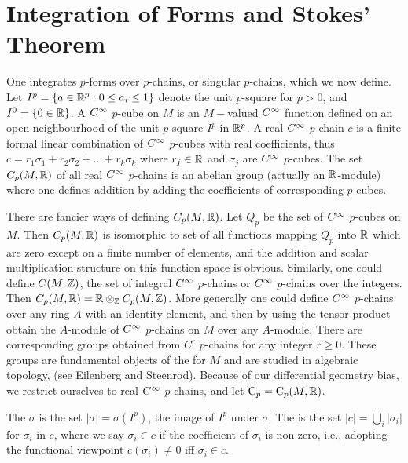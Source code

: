 \documentclass[../main]{subfiles}
\begin{document}
\section{Integration of Forms and Stokes' Theorem}\label{ch07:s5}
One integrates $p$-forms over $p$-chains, or singular $p$-chains, which we now define. Let $I^{p}=\{a \in \mathbb{R}^p : 0 \le a_i \le 1\}$ denote the unit $p$-square for $p>0$, and $I^0=\{0 \in \mathbb{R}\}$. A $C^\infty$ $p$-cube on $M$ is an $M-$valued $C^\infty$ function defined on an open neighbourhood of the unit $p$-square $I^p$ in $\mathbb{R}^p$. A real $C^\infty$ $p$-chain $c$ is a finite formal linear combination of $C^\infty$ $p$-cubes with real coefficients, thus $c=r_{1} \sigma_{1}+r_{2} \sigma_{2}+\ldots+r_{k} \sigma_{k}$ where $r_{j} \in \mathbb{R}$ and $\sigma_{j}$ are $C^\infty$ $p$-cubes. The set $C_{p}(M, \mathbb{R})$ of all real $C^\infty$ $p$-chains is an abelian group (actually an $\mathbb{R}$-module) where one defines addition by adding the coefficients of corresponding $p$-cubes.

There are fancier ways of defining $C_{p}(M, \mathbb{R})$. Let $Q_{p}$ be the set of $C^\infty$ $p$-cubes on $M$. Then $C_{p}(M, \mathbb{R})$ is isomorphic to set of all functions mapping $Q_{p}$ into $\mathbb{R}$ which are zero except on a finite number of elements, and the addition and scalar multiplication structure on this function space is obvious. Similarly, one could define $C(M, \mathbb{Z})$, the set of integral $C^\infty$ $p$-chains or $C^\infty$ $p$-chains over the integers. Then $C_{p}(M, \mathbb{R})=\mathbb{R} \otimes_{\mathbb{Z}} C_{p}(M, \mathbb{Z})$. More generally one could define $C^\infty$ $p$-chains over any ring $A$ with an identity element, and then by using the tensor product obtain the $A$-module of $C^\infty$ $p$-chains on $M$ over any $A$-module. There are corresponding groups obtained from $C^r$ $p$-chains for any integer $r \geq 0$. These groups are fundamental objects of the  for $M$ and are studied in algebraic topology, (see Eilenberg and Steenrod). Because of our differential geometry bias, we restrict ourselves to real $C^\infty$ $p$-chains, and let $\mathrm{C}_{p}=\mathrm{C}_{p}(M, \mathbb{R})$.

The  $\sigma$ is the set $|\sigma|=\sigma\left(I^{p}\right)$, the image of $I^{p}$ under $\sigma$. The  is the set $|c| = \bigcup_i |\sigma_i|$ for $\sigma_i$ in $c$, where we say $\sigma_i \in c$ if the coefficient of $\sigma_i$ is non-zero, i.e., adopting the functional viewpoint $c(\sigma_i) \ne 0$ iff $\sigma_i \in c$.
\end{document}
